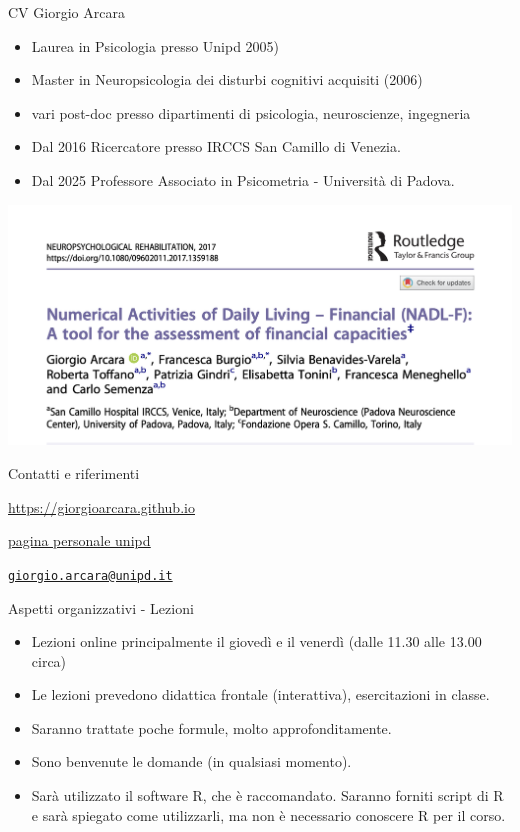 \documentclass[
  ignorenonframetext,
]{beamer}
\providecommand{\tightlist}{%
  \setlength{\itemsep}{0pt}\setlength{\parskip}{0pt}}
\begin{document}
\begin{frame}{CV Giorgio Arcara}
\label{cv-giorgio-arcara}
\footnotesize

\begin{itemize}[<+->]
\item
  Laurea in Psicologia presso Unipd 2005)
\item
  Master in Neuropsicologia dei disturbi cognitivi acquisiti (2006)
\item
  vari post-doc presso dipartimenti di psicologia, neuroscienze,
  ingegneria
\item
  Dal 2016 Ricercatore presso IRCCS San Camillo di Venezia.
\item
  Dal 2025 Professore Associato in Psicometria - Università di Padova.
\end{itemize}

\pause

\hfill
\includegraphics[width=0.6\linewidth,height=\textheight,keepaspectratio]{Figures/NADL_F.png}
\end{frame}

\begin{frame}{Contatti e riferimenti}
\label{contatti-e-riferimenti}
\centering

\href{https://giorgioarcara.github.io}{\ul{https://giorgioarcara.github.io}}

\href{https://www.dpg.unipd.it/category/ruoli/personale-docente?key=4D0707A2DD6FCCD50B90E4C9F316A625}{\ul{pagina
personale unipd}}

\href{mailto:giorgio.arcara@unipd.it}{\nolinkurl{giorgio.arcara@unipd.it}}
\end{frame}

\begin{frame}{Aspetti organizzativi - Lezioni}
\label{aspetti-organizzativi---lezioni}
\begin{itemize}[<+->]
\tightlist
\item
  Lezioni online principalmente il giovedì e il venerdì (dalle 11.30
  alle 13.00 circa)
\item
  Le lezioni prevedono didattica frontale (interattiva), esercitazioni
  in classe.
\item
  Saranno trattate poche formule, molto approfonditamente.
\item
  Sono benvenute le domande (in qualsiasi momento).
\item
  Sarà utilizzato il software R, che è raccomandato. Saranno forniti
  script di R e sarà spiegato come utilizzarli, ma non è necessario
  conoscere R per il corso.
\end{itemize}
\end{frame}
\end{document}
